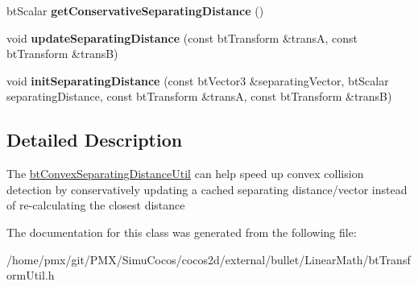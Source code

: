 \begin{DoxyCompactItemize}
bt\+Scalar {\bfseries get\+Conservative\+Separating\+Distance} ()
\item 
\mbox{\label{classbtConvexSeparatingDistanceUtil_af180e70e0e9c8a2c70445b43884be8a3}} 
void {\bfseries update\+Separating\+Distance} (const bt\+Transform \&transA, const bt\+Transform \&transB)
\item 
\mbox{\label{classbtConvexSeparatingDistanceUtil_abb096b617a35cec57c2a7fdb24babfbf}} 
void {\bfseries init\+Separating\+Distance} (const bt\+Vector3 \&separating\+Vector, bt\+Scalar separating\+Distance, const bt\+Transform \&transA, const bt\+Transform \&transB)
\end{DoxyCompactItemize}


\subsection{Detailed Description}
The \hyperlink{classbtConvexSeparatingDistanceUtil}{bt\+Convex\+Separating\+Distance\+Util} can help speed up convex collision detection by conservatively updating a cached separating distance/vector instead of re-\/calculating the closest distance 

The documentation for this class was generated from the following file\+:\begin{DoxyCompactItemize}
\item 
/home/pmx/git/\+P\+M\+X/\+Simu\+Cocos/cocos2d/external/bullet/\+Linear\+Math/bt\+Transform\+Util.\+h\end{DoxyCompactItemize}
